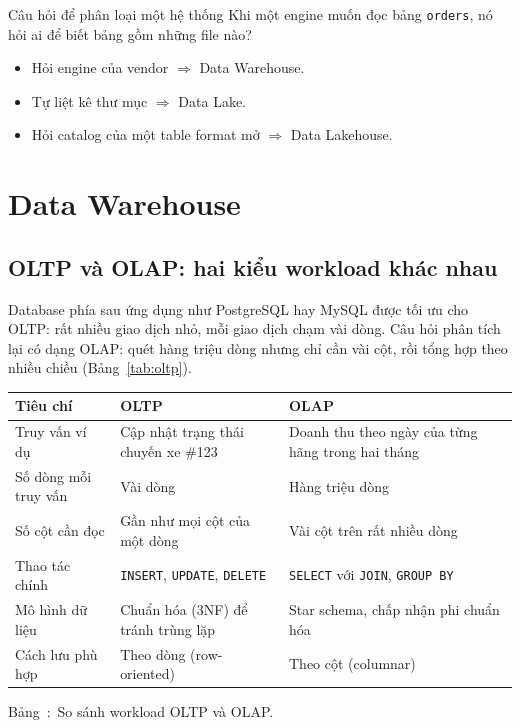 \documentclass[12pt]{article}
\newenvironment{figblock}{\par\medskip\noindent\begin{minipage}{\linewidth}}{\end{minipage}\par\medskip}
\newcounter{bang}
\newcommand{\tabcap}[2]{%
  \begin{captionbelowboxaivn}\refstepcounter{bang}Bảng~\thebang:~#1\label{#2}\end{captionbelowboxaivn}}
\begin{document}
\begin{infobox}{Câu hỏi để phân loại một hệ thống}
Khi một engine muốn đọc bảng \texttt{orders}, nó hỏi ai để biết bảng gồm những file nào?
\begin{itemize}
    \item Hỏi engine của vendor $\Rightarrow$ Data Warehouse.
    \item Tự liệt kê thư mục $\Rightarrow$ Data Lake.
    \item Hỏi catalog của một table format mở $\Rightarrow$ Data Lakehouse.
\end{itemize}
\end{infobox}

\section{Data Warehouse}

\subsection{OLTP và OLAP: hai kiểu workload khác nhau}

Database phía sau ứng dụng như PostgreSQL hay MySQL được tối ưu cho OLTP: rất nhiều giao dịch nhỏ, mỗi giao dịch chạm vài dòng. Câu hỏi phân tích lại có dạng OLAP: quét hàng triệu dòng nhưng chỉ cần vài cột, rồi tổng hợp theo nhiều chiều (Bảng~\ref{tab:oltp}).

\begin{figblock}\begin{center}
\renewcommand{\arraystretch}{1.3}
\begin{tabularx}{\linewidth}{|>{\RaggedRight\arraybackslash}p{3.2cm}|L|L|}
\hline
{}
\textbf{Tiêu chí} & \textbf{OLTP} & \textbf{OLAP} \\
\hline
Truy vấn ví dụ & Cập nhật trạng thái chuyến xe \#123 & Doanh thu theo ngày của từng hãng trong hai tháng \\
\hline
Số dòng mỗi truy vấn & Vài dòng & Hàng triệu dòng \\
\hline
Số cột cần đọc & Gần như mọi cột của một dòng & Vài cột trên rất nhiều dòng \\
\hline
Thao tác chính & \texttt{INSERT}, \texttt{UPDATE}, \texttt{DELETE} & \texttt{SELECT} với \texttt{JOIN}, \texttt{GROUP BY} \\
\hline
Mô hình dữ liệu & Chuẩn hóa (3NF) để tránh trùng lặp & Star schema, chấp nhận phi chuẩn hóa \\
\hline
Cách lưu phù hợp & Theo dòng (row-oriented) & Theo cột (columnar) \\
\hline
\end{tabularx}
\end{center}
\tabcap{So sánh workload OLTP và OLAP.}{tab:oltp}
\end{figblock}
\end{document}
